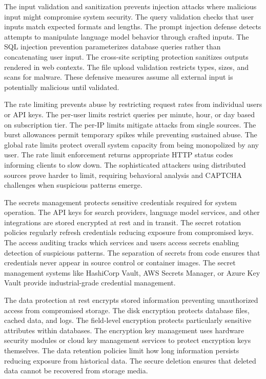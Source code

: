 The input validation and sanitization prevents injection attacks where malicious input might compromise system security. The query validation checks that user inputs match expected formats and lengths. The prompt injection defense detects attempts to manipulate language model behavior through crafted inputs. The SQL injection prevention parameterizes database queries rather than concatenating user input. The cross-site scripting protection sanitizes outputs rendered in web contexts. The file upload validation restricts types, sizes, and scans for malware. These defensive measures assume all external input is potentially malicious until validated.

The rate limiting prevents abuse by restricting request rates from individual users or API keys. The per-user limits restrict queries per minute, hour, or day based on subscription tier. The per-IP limits mitigate attacks from single sources. The burst allowances permit temporary spikes while preventing sustained abuse. The global rate limits protect overall system capacity from being monopolized by any user. The rate limit enforcement returns appropriate HTTP status codes informing clients to slow down. The sophisticated attackers using distributed sources prove harder to limit, requiring behavioral analysis and CAPTCHA challenges when suspicious patterns emerge.

The secrets management protects sensitive credentials required for system operation. The API keys for search providers, language model services, and other integrations are stored encrypted at rest and in transit. The secret rotation policies regularly refresh credentials reducing exposure from compromised keys. The access auditing tracks which services and users access secrets enabling detection of suspicious patterns. The separation of secrets from code ensures that credentials never appear in source control or container images. The secret management systems like HashiCorp Vault, AWS Secrets Manager, or Azure Key Vault provide industrial-grade credential management.

The data protection at rest encrypts stored information preventing unauthorized access from compromised storage. The disk encryption protects database files, cached data, and logs. The field-level encryption protects particularly sensitive attributes within databases. The encryption key management uses hardware security modules or cloud key management services to protect encryption keys themselves. The data retention policies limit how long information persists reducing exposure from historical data. The secure deletion ensures that deleted data cannot be recovered from storage media.

